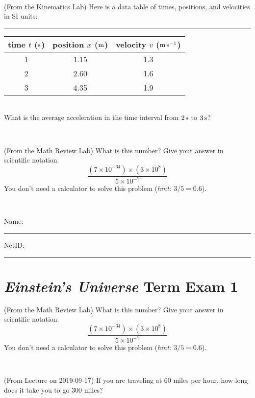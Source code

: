 \documentclass[12pt, letterpaper]{article}
\begin{document}
\vfill ~

\begin{problem} (From the Kinematics Lab)
Here is a data table of times, positions, and velocities in SI units:\\
\rule{1.0in}{0pt}\begin{tabular}{c|c|c}
time $t$ ($\mathrm{s}$) & position $x$ ($\mathrm{m}$) & velocity $v$ ($\mathrm{m}\,\mathrm{s}^{-1}$) \\
\hline
1 & 1.15 & 1.3 \\
2 & 2.60 & 1.6 \\
3 & 4.35 & 1.9 \\
\hline
\end{tabular}\\
What is the average acceleration in the time interval from $2\,\mathrm{s}$ to $3\,\mathrm{s}$?
\end{problem}


\vfill ~

\begin{problem} (From the Math Review Lab)
What is this number? Give your answer in scientific notation.
$$
\frac{(7\times10^{-34})\times(3\times10^8)}{5\times10^{-7}}
$$
You don't need a calculator to solve this problem (\textit{hint: $3/5=0.6$}).
\end{problem}


\vfill ~


\cleardoublepage



\noindent
Name: \rule[-1ex]{0.60\textwidth}{0.1pt}
NetID: \rule[-1ex]{0.20\textwidth}{0.1pt}

\section*{\textsl{Einstein's Universe} Term Exam 1}
\setcounter{problem}{1}


\begin{problem} (From the Math Review Lab)
What is this number? Give your answer in scientific notation.
$$
\frac{(7\times10^{-34})\times(3\times10^8)}{5\times10^{-7}}
$$
You don't need a calculator to solve this problem (\textit{hint: $3/5=0.6$}).
\end{problem}


\vfill ~

\begin{problem} (From Lecture on 2019-09-17)
If you are traveling at 60 miles per hour, how long does
it take you to go 300 miles?
\end{problem}


\vfill ~
\end{document}
